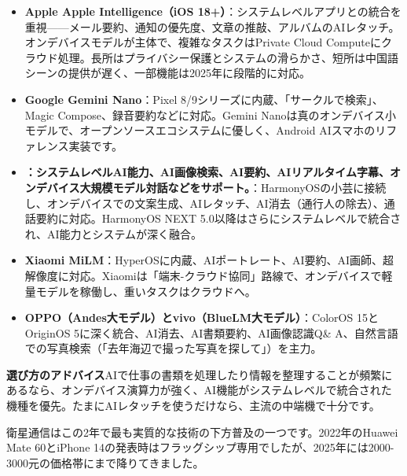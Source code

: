 \begin{itemize}
  \item \textbf{Apple Apple Intelligence（iOS 18+）}：システムレベルアプリとの統合を重視——メール要約、通知の優先度、文章の推敲、アルバムのAIレタッチ。オンデバイスモデルが主体で、複雑なタスクはPrivate Cloud Computeにクラウド処理。長所はプライバシー保護とシステムの滑らかさ、短所は中国語シーンの提供が遅く、一部機能は2025年に段階的に対応。
  \item \textbf{Google Gemini Nano}：Pixel 8/9シリーズに内蔵、「サークルで検索」、Magic Compose、録音要約などに対応。Gemini Nanoは真のオンデバイス小モデルで、オープンソースエコシステムに優しく、Android AIスマホのリファレンス実装です。
  \item \textbf{：システムレベルAI能力、AI画像検索、AI要約、AIリアルタイム字幕、オンデバイス大規模モデル対話などをサポート。}：HarmonyOSの小芸に接続し、オンデバイスでの文案生成、AIレタッチ、AI消去（通行人の除去）、通話要約に対応。HarmonyOS NEXT 5.0以降はさらにシステムレベルで統合され、AI能力とシステムが深く融合。
  \item \textbf{Xiaomi MiLM}：HyperOSに内蔵、AIポートレート、AI要約、AI画師、超解像度に対応。Xiaomiは「端末-クラウド協同」路線で、オンデバイスで軽量モデルを稼働し、重いタスクはクラウドへ。
  \item \textbf{OPPO（Andes大モデル）とvivo（BlueLM大モデル）}：ColorOS 15とOriginOS 5に深く統合、AI消去、AI書類要約、AI画像認識Q\& A、自然言語での写真検索（「去年海辺で撮った写真を探して」）を主力。
\end{itemize}

\textbf{選び方のアドバイス}AIで仕事の書類を処理したり情報を整理することが頻繁にあるなら、オンデバイス演算力が強く、AI機能がシステムレベルで統合された機種を優先。たまにAIレタッチを使うだけなら、主流の中端機で十分です。


衛星通信はこの2年で最も実質的な技術の下方普及の一つです。2022年のHuawei Mate 60とiPhone 14の発表時はフラッグシップ専用でしたが、2025年には2000-3000元の価格帯にまで降りてきました。


